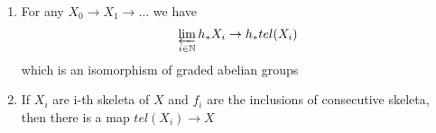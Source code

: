 \documentclass[../main.tex]{subfiles}
\begin{document}
\begin{propo}
\begin{enumerate}
\item For any $X_0\to X_1\to \ldots$ we have
	\[ 
	\varprojlim_{i\in \mathbb{N}} h_\ast X_i \to h_\ast tel( X_i) 
	\]
	which is an isomorphism of graded abelian groups
\item If $X_i$ are i-th skeleta of $X$ and $f_i$ are the inclusions of consecutive skeleta, then there is a map $tel( X_i) \to X$ 
\end{enumerate}

\end{propo}
\end{document}
